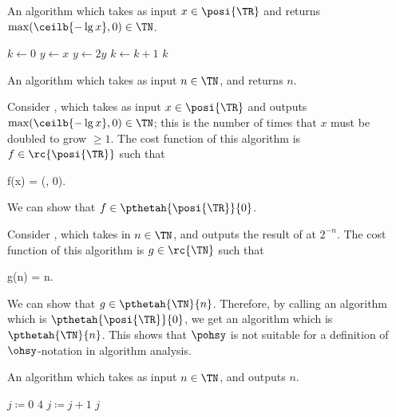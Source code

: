 \documentclass[b5paper, english, oneside]{memoir}
\begin{document}
\begin{algorithm}
\caption{An algorithm which takes as input $x \in \posi{\TR}$ and returns $\max(\ceilb{-\lg{x}}, 0) \in \TN$.}
\label{alg:Real}
\begin{algorithmic}[1]
\State $k \gets 0$
\State $y \gets x$
  \State $y \gets 2y$
  \State $k \gets k + 1$
\EndWhile
\State \Return $k$
\EndProcedure
\end{algorithmic}
\end{algorithm}

\begin{algorithm}
\caption{An algorithm which takes as input $n \in \TN$, and returns $n$.}
\label{alg:UnivariateBroken}
\begin{algorithmic}[1]
\State \Return {}
\EndProcedure
\end{algorithmic}
\end{algorithm}

\begin{example}
\label{UnivariateCounterExampleInRSubAlgorithm}
Consider , which takes as input $x \in \posi{\TR}$ and outputs $\max(\ceilb{-\lg{x}}, 0) \in \TN$; this is the number of times that $x$ must be doubled to grow $\geq 1$. The cost function of this algorithm is $f \in \rc{\posi{\TR}}$ such that
\begin{eqs}
f(x) = \max(, 0).
\end{eqs}
We can show that $f \in \pthetah{\posi{\TR}}{0}$.
\end{example}

\begin{example}
\label{UnivariateCounterExampleInR}
Consider , which takes in $n \in \TN$, and outputs the result of  at $2^{-n}$. The cost function of this algorithm is $g \in \rc{\TN}$ such that
\begin{eqs}
g(n) = n.
\end{eqs}
We can show that $g \in \pthetah{\TN}{n}$. Therefore, by calling an algorithm which is $\pthetah{\posi{\TR}}{0}$, we get an algorithm which is $\pthetah{\TN}{n}$. This shows that $\pohsy$ is not suitable for a definition of $\ohsy$-notation in algorithm analysis.
\end{example}

\begin{algorithm}
\caption{An algorithm which takes as input $n \in \TN$, and outputs $n$.}
\label{alg:AlmostIdentity}
\begin{algorithmic}[1]
\State $j \coloneqq 0$
\State \Return $4$
\EndIf
{}
\State $j \coloneqq j + 1$
\EndFor
\State \Return $j$
\EndProcedure
\end{algorithmic}
\end{algorithm}
\end{document}
